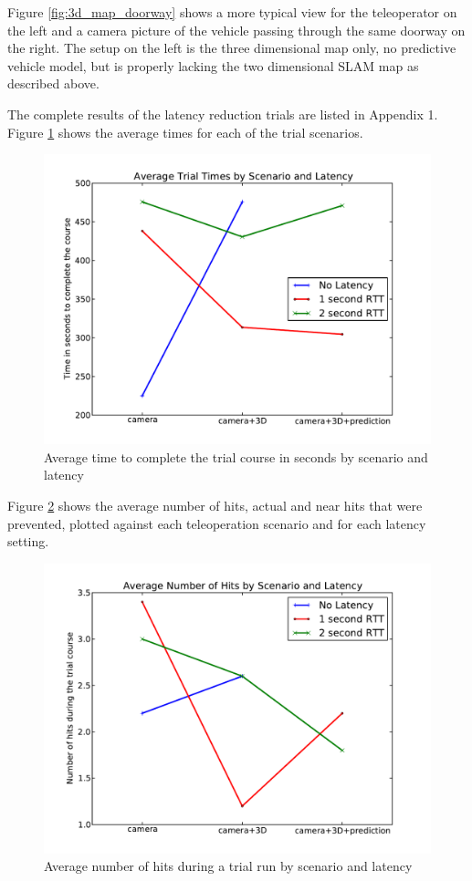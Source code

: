 \documentclass[12pt]{report}
\begin{document}
Figure \ref{fig:3d_map_doorway} shows a more typical view for the teleoperator on the left and a camera picture of the vehicle passing through the same doorway on the right.  The setup on the left is the three dimensional map only, no predictive vehicle model, but is properly lacking the two dimensional SLAM map as described above.

The complete results of the latency reduction trials are listed in Appendix 1.  Figure \ref{fig:trial_times} shows the average times for each of the trial scenarios.

\begin{figure}[ht]
  \centering
  \includegraphics[width=6.5in,keepaspectratio]{trial_times.pdf}
  \caption{Average time to complete the trial course in seconds by scenario and latency}
  \label{fig:trial_times}
\end{figure}

Figure \ref{fig:trial_hits} shows the average number of hits, actual and near hits that were prevented, plotted against each teleoperation scenario and for each latency setting.

\begin{figure}[ht]
  \centering
  \includegraphics[width=6.5in,keepaspectratio]{trial_hits.pdf}
  \caption{Average number of hits during a trial run by scenario and latency}
  \label{fig:trial_hits}
\end{figure}
\end{document}
